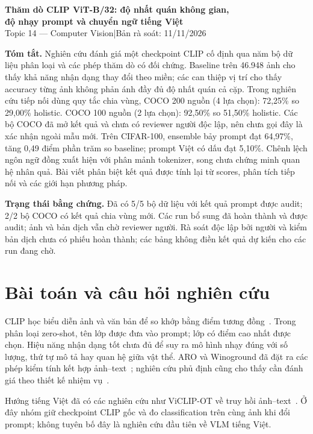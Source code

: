 \documentclass[11pt,a4paper]{article}
\begin{document}
\begin{center}{\Large\bfseries Thăm dò CLIP ViT-B/32: độ nhất quán không gian,\\ độ nhạy prompt và chuyển ngữ tiếng Việt}\\[5pt]
{\small Topic 14 — Computer Vision\quad |\quad Bản rà soát: 11/11/2026}
\end{center}
\textbf{Tóm tắt.} Nghiên cứu đánh giá một checkpoint CLIP cố định qua năm bộ dữ liệu phân loại và các phép thăm dò có đối chứng. Baseline trên 46.948 ảnh cho thấy khả năng nhận dạng thay đổi theo miền; các can thiệp vị trí cho thấy accuracy từng ảnh không phản ánh đầy đủ độ nhất quán cả cặp. Trong nghiên cứu tiếp nối dùng quy tắc chia vùng, COCO 200 nguồn (4 lựa chọn): 72,25\% so 29,00\% holistic. COCO 100 nguồn (2 lựa chọn): 92,50\% so 51,50\% holistic. Các bộ COCO đã mở kết quả và chưa có reviewer người độc lập, nên chưa gọi đây là xác nhận ngoài mẫu mới. Trên CIFAR-100, ensemble bảy prompt đạt 64,97\%, tăng 0,49 điểm phần trăm so baseline; prompt Việt có dấu đạt 5,10\%. Chênh lệch ngôn ngữ đồng xuất hiện với phân mảnh tokenizer, song chưa chứng minh quan hệ nhân quả. Bài viết phân biệt kết quả được tính lại từ scores, phân tích tiếp nối và các giới hạn phương pháp.

\textbf{Trạng thái bằng chứng.} Đã có 5/5 bộ dữ liệu với kết quả prompt được audit; 2/2 bộ COCO có kết quả chia vùng mới. Các run bổ sung đã hoàn thành và được audit; ảnh và bản dịch vẫn chờ reviewer người. Rà soát độc lập bởi người và kiểm bản dịch chưa có phiếu hoàn thành; các bảng không điền kết quả dự kiến cho các run đang chờ.

\section{Bài toán và câu hỏi nghiên cứu}
CLIP học biểu diễn ảnh và văn bản để so khớp bằng điểm tương đồng~\cite{clip}. Trong phân loại zero-shot, tên lớp được đưa vào prompt; lớp có điểm cao nhất được chọn. Hiệu năng nhận dạng tốt chưa đủ để suy ra mô hình nhạy đúng với số lượng, thứ tự mô tả hay quan hệ giữa vật thể. ARO và Winoground đã đặt ra các phép kiểm tính kết hợp ảnh--text~\cite{aro,winoground}; nghiên cứu phủ định cũng cho thấy cần đánh giá theo thiết kế nhiệm vụ~\cite{negbench}.

Hướng tiếng Việt đã có các nghiên cứu như ViCLIP-OT về truy hồi ảnh--text~\cite{viclip}. Ở đây nhóm giữ checkpoint CLIP gốc và đo classification trên cùng ảnh khi đổi prompt; không tuyên bố đây là nghiên cứu đầu tiên về VLM tiếng Việt.
\end{document}
